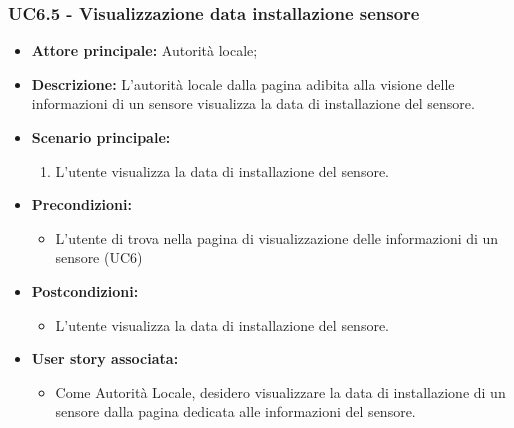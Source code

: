 \subsubsection{UC6.5 - Visualizzazione data installazione sensore}
\begin{itemize}
    \item \textbf{Attore principale:} Autorità locale;
    \item \textbf{Descrizione:} L’autorità locale dalla pagina adibita alla visione delle informazioni di un sensore visualizza la data di installazione del sensore.
    \item \textbf{Scenario principale:}
          \begin{enumerate}
              \item L'utente visualizza la data di installazione del sensore.
          \end{enumerate}
    \item \textbf{Precondizioni:}
          \begin{itemize}
              \item  L'utente di trova nella pagina di visualizzazione delle informazioni di un sensore (UC6)
          \end{itemize}
    \item \textbf{Postcondizioni:}
          \begin{itemize}
              \item  L'utente visualizza la data di installazione del sensore.
          \end{itemize}
    \item \textbf{User story associata:}
          \begin{itemize}
              \item Come Autorità Locale, desidero visualizzare la data di installazione di un sensore dalla pagina dedicata alle informazioni del sensore.
          \end{itemize}
\end{itemize}